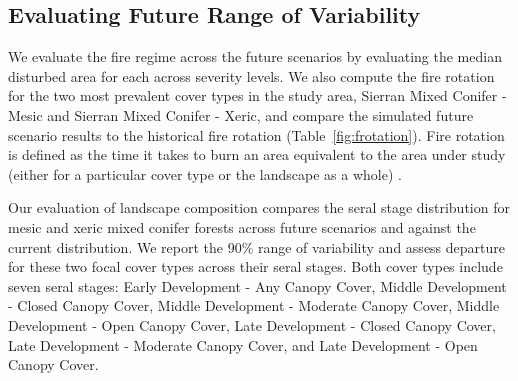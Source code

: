 \documentclass[12pt]{article}
\begin{document}
\begin{spacing}{1}
\subsection*{Evaluating Future Range of Variability}
We evaluate the fire regime across the future scenarios by evaluating the median disturbed area for each across severity levels. %
We also compute the fire rotation for the two most prevalent cover types in the study area, Sierran Mixed Conifer - Mesic and Sierran Mixed Conifer - Xeric, and compare the simulated future scenario results to the historical fire rotation (Table~\ref{fig:frotation}). Fire rotation is defined as the time it takes to burn an area equivalent to the area under study (either for a particular cover type or the landscape as a whole) \citep{Agee1993}.%
%


Our evaluation of landscape composition compares the seral stage distribution for mesic and xeric mixed conifer forests across future scenarios and against the current distribution. We report the 90\% range of variability and assess departure for these two focal cover types across their seral stages. Both cover types include seven seral stages: Early Development - Any Canopy Cover, Middle Development - Closed Canopy Cover, Middle Development - Moderate Canopy Cover, Middle Development - Open Canopy Cover, Late Development - Closed Canopy Cover, Late Development - Moderate Canopy Cover, and Late Development - Open Canopy Cover.



\end{spacing}
\end{document}
